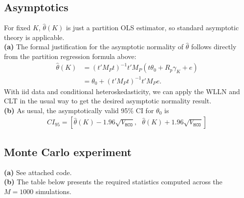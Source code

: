 \documentclass[12pt]{article}
\newcommand{\mtx}[1]{\ensuremath{\bm{\mathit{#1}}}}
\begin{document}
\subsection{Asymptotics}
For fixed $K$, $\hat \theta(K)$ is just a partition OLS estimator, so standard asymptotic theory is applicable.  \\

\textbf{(a)} The formal justification for the asymptotic normality of $\hat \theta$ follows directly from the partition regression formula above:
\begin{align*}
\hat \theta(K) &= (\mtx{t}'\mtx{M}_{P}\mtx{t})^{-1}\mtx{t}'\mtx{M}_P(\mtx{t}\theta_0 + \mtx{R}_p\mtx{\gamma}_K+ \mtx{e})\\
&=\theta_0 + (\mtx{t}'\mtx{M}_{P}\mtx{t})^{-1}\mtx{t}'\mtx{M}_P\mtx{e}.
\end{align*}
With iid data and conditional heteroskedasticity, we can apply the WLLN and CLT in the usual way to get the desired asymptotic normality result.\\

\textbf{(b)} As usual, the asymptotically valid 95\% CI for $\theta_0$ is
\begin{align*}
CI_{95} = [\hat \theta(K) - 1.96 \sqrt{V_{\texttt{HCO}}},\text{ }\hat \theta(K) + 1.96 \sqrt{V_{\texttt{HCO}}}]
\end{align*}

\newpage

\subsection{Monte Carlo experiment}

\textbf{(a)} See attached code.\\

\textbf{(b)} The table below presents the required statistics computed across the $M=1000$ simulations.
\end{document}
